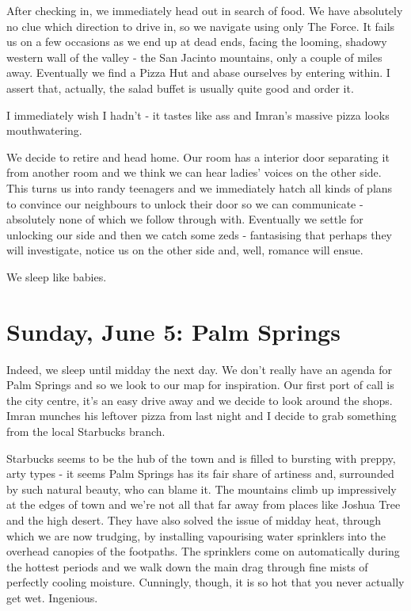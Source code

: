 \documentclass[a5paper,titlepage,11pt]{book}
\begin{document}
After checking in, we immediately head out in search of food. We have absolutely no clue which direction to drive in, so we navigate using only The Force. It fails us on a few occasions as we end up at dead ends, facing the looming, shadowy western wall of the valley - the San Jacinto mountains, only a couple of miles away. Eventually we find a Pizza Hut and abase ourselves by entering within. I assert that, actually, the salad buffet is usually quite good and order it.

I immediately wish I hadn't - it tastes like ass and Imran's massive pizza looks mouthwatering.

We decide to retire and head home. Our room has a interior door separating it from another room and we think we can hear ladies' voices on the other side. This turns us into randy teenagers and we immediately hatch all kinds of plans to convince our neighbours to unlock their door so we can communicate - absolutely none of which we follow through with. Eventually we settle for unlocking our side and then we catch some zeds - fantasising that perhaps they will investigate, notice us on the other side and, well, romance will ensue.

We sleep like babies.

\chapter[Palm Springs]{Sunday, June 5:  Palm Springs}
Indeed, we sleep until midday the next day. We don't really have an agenda for Palm Springs and so we look to our map for inspiration. Our first port of call is the city centre, it's an easy drive away and we decide to look around the shops. Imran munches his leftover pizza from last night and I decide to grab something from the local Starbucks branch.

Starbucks seems to be the hub of the town and is filled to bursting with preppy, arty types - it seems Palm Springs has its fair share of artiness and, surrounded by such natural beauty, who can blame it. The mountains climb up impressively at the edges of town and we're not all that far away from places like Joshua Tree and the high desert. They have also solved the issue of midday heat, through which we are now trudging, by installing vapourising water sprinklers into the overhead canopies of the footpaths. The sprinklers come on automatically during the hottest periods and we walk down the main drag through fine mists of perfectly cooling moisture. Cunningly, though, it is so hot that you never actually get wet. Ingenious.
\end{document}
